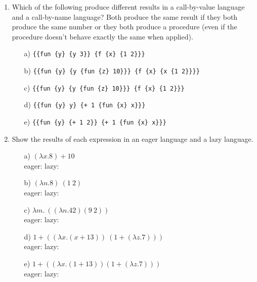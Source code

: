 \begin{enumerate}
\item Which of the following produce different results in a
 call-by-value language and a call-by-name language? Both produce the
 same result if they both produce the same number or they both produce
 a procedure (even if the procedure doesn't behave exactly the same
 when applied).

\begin{itemize}
  \item[a)] \verb!{{fun {y} {y 3}} {f {x} {1 2}}}!
  \item[b)] \verb!{{fun {y} {y {fun {z} 10}}} {f {x} {x {1 2}}}}!
  \item[c)] \verb!{{fun {y} {y {fun {z} 10}}} {f {x} {1 2}}}!
  \item[d)] \verb!{{fun {y} y} {+ 1 {fun {x} x}}}!
  \item[e)] \verb!{{fun {y} {+ 1 2}} {+ 1 {fun {x} x}}}!
\end{itemize}

\item Show the results of each expression in an eager language and a lazy language.
\begin{itemize}

  \item[a)] \((\lambda x. 8) + 10\)
\\[1em]
eager:
\hspace*{5em}
lazy:\\

  \item[b)] \((\lambda n. 8)\ (1\ 2)\)
\\[1em]
eager:
\hspace*{5em}
lazy:\\

  \item[c)] \(\lambda m.\ ((\lambda n. 42) (9\ 2))\)
\\[1em]
eager:
\hspace*{5em}
lazy:\\

  \item[d)] \(1 + ((\lambda x.(x + 13))\ (1 + (\lambda z.7)))\)
\\[1em]
eager:
\hspace*{5em}
lazy:\\

  \item[e)] \(1 + ((\lambda x. (1 + 13)) (1 + (\lambda z. 7)))\)
\\[1em]
eager:
\hspace*{5em}
lazy:\\


\end{itemize}
\end{enumerate}
